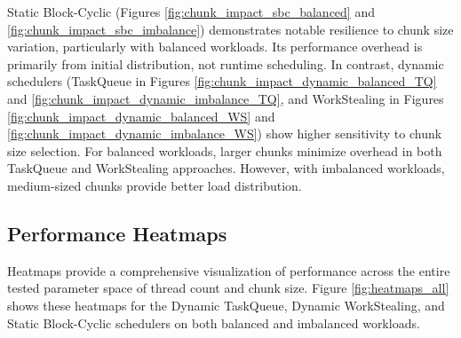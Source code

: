 \documentclass[10pt]{article}
\begin{document}
Static Block-Cyclic (Figures \ref{fig:chunk_impact_sbc_balanced} and \ref{fig:chunk_impact_sbc_imbalance}) demonstrates notable resilience to chunk size variation, particularly with balanced workloads. Its performance overhead is primarily from initial distribution, not runtime scheduling. In contrast, dynamic schedulers (TaskQueue in Figures \ref{fig:chunk_impact_dynamic_balanced_TQ} and \ref{fig:chunk_impact_dynamic_imbalance_TQ}, and WorkStealing in Figures \ref{fig:chunk_impact_dynamic_balanced_WS} and \ref{fig:chunk_impact_dynamic_imbalance_WS}) show higher sensitivity to chunk size selection. For balanced workloads, larger chunks minimize overhead in both TaskQueue and WorkStealing approaches. However, with imbalanced workloads, medium-sized chunks provide better load distribution.

\subsection{Performance Heatmaps}
Heatmaps provide a comprehensive visualization of performance across the entire tested parameter space of thread count and chunk size. Figure \ref{fig:heatmaps_all} shows these heatmaps for the Dynamic TaskQueue, Dynamic WorkStealing, and Static Block-Cyclic schedulers on both balanced and imbalanced workloads.
\end{document}
